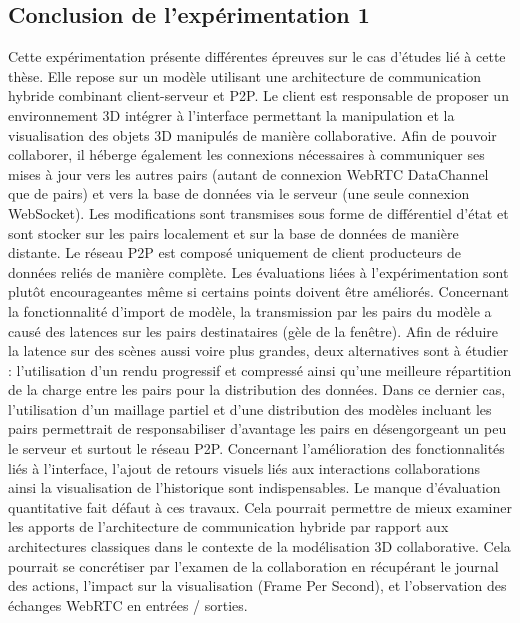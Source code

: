 \subsection{Conclusion de l'expérimentation 1}


Cette expérimentation présente différentes épreuves sur le cas d'études lié à cette 
thèse. Elle repose sur un modèle utilisant une architecture de communication 
hybride combinant client-serveur et \gls{P2P}. Le client est responsable de 
proposer un environnement 3D intégrer à l'interface permettant la manipulation et 
la visualisation des objets 3D manipulés de manière collaborative. Afin de pouvoir 
collaborer, il héberge également les connexions nécessaires à communiquer ses 
mises à jour vers les autres pairs (autant de connexion WebRTC DataChannel que 
de pairs) et vers la base de données via le serveur (une seule connexion 
WebSocket). Les modifications sont transmises sous forme de différentiel d'état et 
sont stocker sur les pairs localement et sur la base de données de manière 
distante. Le réseau \gls{P2P} est composé uniquement de client producteurs de 
données reliés de manière complète. 
Les évaluations liées à l'expérimentation sont plutôt encourageantes même si 
certains points doivent être améliorés. Concernant la fonctionnalité d'import de 
modèle, la transmission par les pairs du modèle a causé des latences sur les 
pairs destinataires (gèle de la fenêtre). Afin de réduire la latence sur des scènes 
aussi voire plus grandes, deux alternatives sont à étudier : l'utilisation d'un 
rendu progressif et compressé ainsi qu'une meilleure répartition de la charge entre 
les pairs pour la distribution des données. Dans ce dernier cas, l'utilisation d'un 
maillage partiel et d'une distribution des modèles incluant les pairs permettrait de 
responsabiliser d'avantage les pairs en désengorgeant un peu le serveur et surtout 
le réseau \gls{P2P}.
Concernant l'amélioration des fonctionnalités liés à l'interface, l'ajout de retours 
visuels liés aux interactions collaborations ainsi la visualisation de l'historique sont 
indispensables. Le manque 
d'évaluation quantitative fait défaut à ces travaux. Cela pourrait permettre de 
mieux examiner les apports de l'architecture de communication hybride par rapport 
aux architectures classiques dans le contexte de la modélisation 3D collaborative. 
Cela pourrait se concrétiser par l'examen de la collaboration en récupérant le 
journal des actions, l'impact sur la visualisation (Frame Per Second), et 
l'observation des échanges WebRTC en entrées / sorties.

